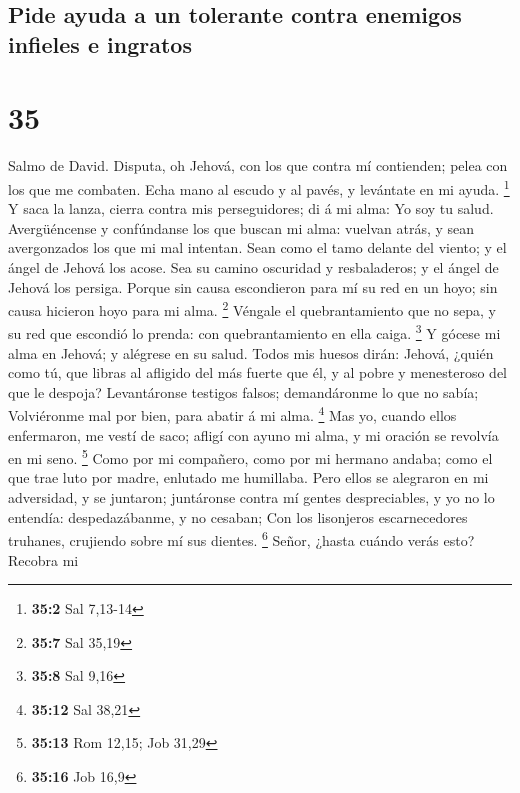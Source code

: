 \hypertarget{pide-ayuda-a-un-tolerante-contra-enemigos-infieles-e-ingratos}{%
\subsection{Pide ayuda a un tolerante contra enemigos infieles e
ingratos}\label{pide-ayuda-a-un-tolerante-contra-enemigos-infieles-e-ingratos}}

\hypertarget{section-34}{%
\section{35}\label{section-34}}

 Salmo de David. Disputa, oh Jehová, con los que contra mí
contienden; pelea con los que me combaten.  Echa mano al
escudo y al pavés, y levántate en mi ayuda. \footnote{\textbf{35:2} Sal
  7,13-14}  Y saca la lanza, cierra contra mis
perseguidores; di á mi alma: Yo soy tu salud.  Avergüéncense
y confúndanse los que buscan mi alma: vuelvan atrás, y sean avergonzados
los que mi mal intentan.  Sean como el tamo delante del
viento; y el ángel de Jehová los acose.  Sea su camino
oscuridad y resbaladeros; y el ángel de Jehová los persiga. 
Porque sin causa escondieron para mí su red en un hoyo; sin causa
hicieron hoyo para mi alma. \footnote{\textbf{35:7} Sal 35,19}
 Véngale el quebrantamiento que no sepa, y su red que
escondió lo prenda: con quebrantamiento en ella caiga. \footnote{\textbf{35:8}
  Sal 9,16}  Y gócese mi alma en Jehová; y alégrese en su
salud.  Todos mis huesos dirán: Jehová, ¿quién como tú, que
libras al afligido del más fuerte que él, y al pobre y menesteroso del
que le despoja?  Levantáronse testigos falsos; demandáronme
lo que no sabía;  Volviéronme mal por bien, para abatir á
mi alma. \footnote{\textbf{35:12} Sal 38,21}  Mas yo,
cuando ellos enfermaron, me vestí de saco; afligí con ayuno mi alma, y
mi oración se revolvía en mi seno. \footnote{\textbf{35:13} Rom 12,15;
  Job 31,29}  Como por mi compañero, como por mi hermano
andaba; como el que trae luto por madre, enlutado me humillaba.
 Pero ellos se alegraron en mi adversidad, y se juntaron;
juntáronse contra mí gentes despreciables, y yo no lo entendía:
despedazábanme, y no cesaban;  Con los lisonjeros
escarnecedores truhanes, crujiendo sobre mí sus dientes. \footnote{\textbf{35:16}
  Job 16,9}  Señor, ¿hasta cuándo verás esto? Recobra mi
